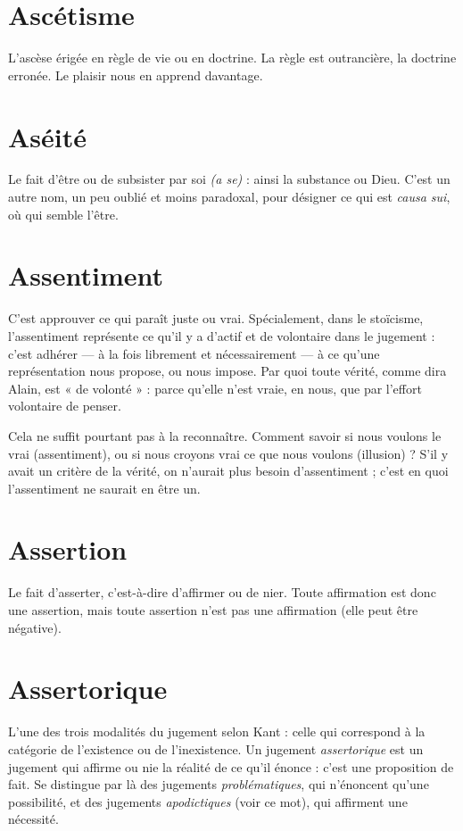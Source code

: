 \section{Ascétisme}
L’ascèse érigée en règle de vie ou en doctrine. La règle est
outrancière, la doctrine erronée. Le plaisir nous en apprend
davantage.

\section{Aséité}
Le fait d’être ou de subsister par soi {\it (a se)} : ainsi la substance ou
Dieu. C’est un autre nom, un peu oublié et moins paradoxal, pour
désigner ce qui est {\it causa sui}, où qui semble l’être.

\section{Assentiment}
C’est approuver ce qui paraît juste ou vrai. Spécialement,
dans le stoïcisme, l’assentiment représente ce qu’il y a
d’actif et de volontaire dans le jugement : c’est adhérer — à la fois librement et
nécessairement — à ce qu’une représentation nous propose, ou nous impose.
Par quoi toute vérité, comme dira Alain, est « de volonté » : parce qu’elle n’est
vraie, en nous, que par l'effort volontaire de penser.

Cela ne suffit pourtant pas à la reconnaître. Comment savoir si nous voulons
le vrai (assentiment), ou si nous croyons vrai ce que nous voulons
(illusion) ? S'il y avait un critère de la vérité, on n’aurait plus besoin
d’assentiment ; c’est en quoi l’assentiment ne saurait en être un.

\section{Assertion}
Le fait d’asserter, c’est-à-dire d’affirmer ou de nier. Toute affirmation
est donc une assertion, mais toute assertion n’est pas
une affirmation (elle peut être négative).

\section{Assertorique}
L’une des trois modalités du jugement selon Kant : celle
qui correspond à la catégorie de l’existence ou de l’inexistence.
Un jugement {\it assertorique} est un jugement qui affirme ou nie la réalité de
ce qu’il énonce : c’est une proposition de fait. Se distingue par là des jugements
{\it problématiques}, qui n’énoncent qu’une possibilité, et des jugements {\it apodictiques}
(voir ce mot), qui affirment une nécessité.


